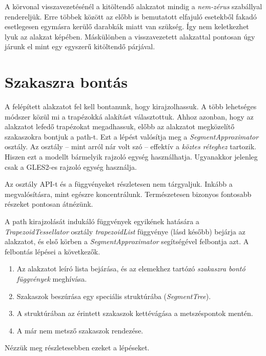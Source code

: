 \documentclass[12pt]{report}
\theoremstyle{definition}
\newcommand{\func}[1]{{\textsl{#1}}}
\begin{document}
A körvonal visszavezetésénél a kitöltendő alakzatot mindig a \emph{nem-zérus}
szabállyal rendereljük. Erre többek között az előbb is bemutatott elfajuló
esetekből fakadó esetlegesen egymásra kerülő darabkák miatt van szükség. Így
nem keletkezhet lyuk az alakzat képében. Máskülönben a visszavezetett
alakzattal pontosan úgy járunk el mint egy egyszerű kitöltendő párjával.

  \section{Szakaszra bontás}

A felépített alakzatot fel kell bontanunk, hogy kirajzolhassuk. A több
lehetséges módszer közül mi a trapézokká alakítást választottuk. Ahhoz azonban,
hogy az alakzatot lefedő trapézokat megadhassuk, előbb az alakzatot megközelítő
szakaszokra bontjuk a path-t. Ezt a lépést valósítja meg a
\func{SegmentApproximator} osztály. Az osztály -- mint arról nár volt szó --
effektív a \emph{köztes réteghez} tartozik. Hiszen ezt a modellt bármelyik
rajzoló egység használhatja. Ugyanakkor jelenleg csak a GLES2-es rajzoló egység
használja.

Az osztály API-t és a függvényeket részletesen nem tárgyaljuk. Inkább a
megvalósításra, mint egészre koncentrálunk. Természetesen bizonyos fontosabb
részeket pontosan átnézünk.

A path kirajzolását indukáló függvények egyikének hatására a
\func{TrapezoidTessellator} osztály \func{trapezoidList} függvénye (lásd
később) bejárja az alakzatot, és első körben a \func{SegmentApproximator}
segítségével felbontja azt. A felbontás lépései a következők.
  \begin{enumerate}
    \item Az alakzatot leíró lista bejárása, és az elemekhez tartózó
    \emph{szakaszra bontó függvények} meghívása.
    \item Szakaszok beszúrása egy speciális struktúrába (\func{SegmentTree}).
    \item A struktúrában az érintett szakaszok kettévágása a metszéspontok
    mentén.
    \item A már nem metsző szakaszok rendezése.
  \end{enumerate}
Nézzük meg részletesebben ezeket a lépéseket.
\end{document}
